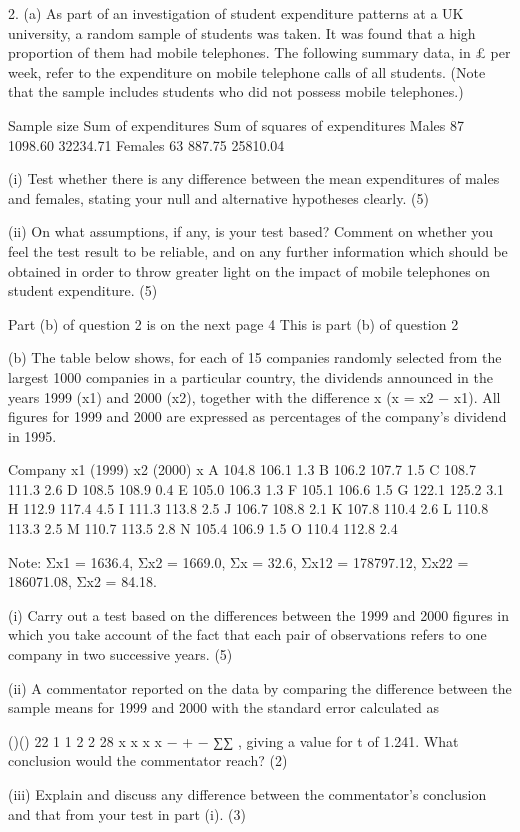 \documentclass[a4paper,12pt]{article}
\begin{document}
\begin{framed}
2. (a) As part of an investigation of student expenditure patterns at a UK university, a random sample of students was taken.  
It was found that a high proportion of them had mobile telephones.  The following summary data, in £ per week, refer to the expenditure on mobile telephone calls of all students.  (Note that the sample includes students who did not possess mobile telephones.) 
 
 Sample size Sum of expenditures 
Sum of squares of expenditures Males 87 1098.60 32234.71 Females 63   887.75 25810.04 
 
 
(i) Test whether there is any difference between the mean expenditures of males and females, stating your null and alternative hypotheses clearly. (5) 
 
 
(ii) On what assumptions, if any, is your test based?  Comment on whether you feel the test result to be reliable, and on any further information which should be obtained in order to throw greater light on the impact of mobile telephones on student expenditure. (5) 
 
 
 
 
 
 
 
 
Part (b) of question 2 is on the next page 
4 
This is part (b) of question 2 
 
 
(b) The table below shows, for each of 15 companies randomly selected from the largest 1000 companies in a particular country, 
the dividends announced in the years 1999 (x1) and 2000 (x2), together with the difference x (x = x2 − x1).  All figures for 1999 
and 2000 are expressed as percentages of the company's dividend in 1995. 
 
Company x1   (1999) x2    (2000) x 
A 104.8 106.1 1.3 B 106.2 107.7 1.5 
C 108.7 111.3 2.6 D 108.5 108.9 0.4 
E 105.0 106.3 1.3 F 105.1 106.6 1.5 
G 122.1 125.2 3.1 H 112.9 117.4 4.5 
I 111.3 113.8 2.5 J 106.7 108.8 2.1 
K 107.8 110.4 2.6 L 110.8 113.3 2.5 
M 110.7 113.5 2.8 N 105.4 106.9 1.5 
O 110.4 112.8 2.4 

 Note:   Σx1 = 1636.4,    Σx2 = 1669.0,    Σx = 32.6,             Σx12 = 178797.12,    Σx22 = 186071.08,    Σx2 = 84.18. 
 
 
(i) Carry out a test based on the differences between the 1999 and 2000 figures in which you take account of the fact that each pair of observations refers to one company in two successive years. (5) 
 
(ii) A commentator reported on the data by comparing the difference between the sample means for 1999 and 2000 with the standard error calculated as 
 
 ()() 22 1 1 2 2 28 x x x x − + − ∑∑ , 
 giving a value for t of 1.241.  What conclusion would the commentator reach? (2) 
 
(iii) Explain and discuss any difference between the commentator's conclusion and that from your test in part (i). (3) 

\end{framed}
\end{document}
